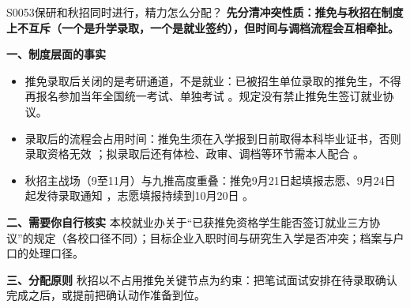 \begin{qa}{S0053}{保研和秋招同时进行，精力怎么分配？}
\textbf{先分清冲突性质：推免与秋招在制度上不互斥（一个是升学录取，一个是就业签约），但时间与调档流程会互相牵扯。}

\textbf{一、制度层面的事实}
\begin{itemize}
  \item 推免录取后关闭的是考研通道，不是就业：已被招生单位录取的推免生，不得再报名参加当年全国统一考试、单独考试 。规定没有禁止推免生签订就业协议。
  \item 录取后的流程会占用时间：推免生须在入学报到日前取得本科毕业证书，否则录取资格无效 ；拟录取后还有体检、政审、调档等环节需本人配合 。
  \item 秋招主战场（9至11月）与九推高度重叠：推免9月21日起填报志愿、9月24日起发待录取通知 ，志愿填报持续到10月20日 。
\end{itemize}

\textbf{二、需要你自行核实}
本校就业办关于“已获推免资格学生能否签订就业三方协议”的规定（各校口径不同）；目标企业入职时间与研究生入学是否冲突；档案与户口的处理口径。

\textbf{三、分配原则}
秋招以不占用推免关键节点为约束：把笔试面试安排在待录取确认完成之后，或提前把确认动作准备到位。
\end{qa}

